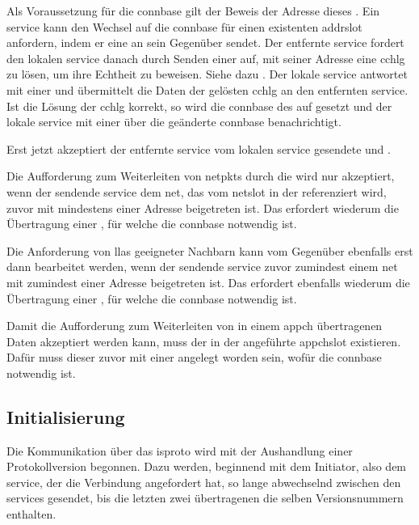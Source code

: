 Als Voraussetzung für die \gls{connbase}  gilt der Beweis der Adresse dieses
. Ein \gls{service} kann den Wechsel auf die \gls{connbase}
 für einen existenten \gls{addrslot} anfordern, indem er eine \msg{\isprotots}
an sein Gegenüber sendet.
Der entfernte \gls{service} fordert den lokalen \gls{service} danach durch Senden einer
\msg{\isprotoccreq} auf, mit seiner Adresse eine \gls{cchlg} zu lösen, um ihre Echtheit zu
beweisen. Siehe dazu .
Der lokale \gls{service} antwortet mit einer \msg{\isprotoccrep} und übermittelt die Daten der
gelösten \gls{cchlg} an den entfernten \gls{service}.
Ist die Lösung der \gls{cchlg} korrekt, so wird die \gls{connbase} des
 auf  gesetzt und der lokale \gls{service} mit
einer \msg{\isprotocbn} über die geänderte \gls{connbase} benachrichtigt.

Erst jetzt akzeptiert der entfernte \gls{service} vom lokalen \gls{service} gesendete
\msgpl{\isprotonjn} und \msgpl{\isprotonln}.

Die Aufforderung zum Weiterleiten von \glspl{netpkt} durch die \msg{\isprotonp} wird nur
akzeptiert, wenn der sendende \gls{service} dem \gls{net}, das vom \gls{netslot} in der
\msg{\isprotonp} referenziert wird, zuvor mit mindestens einer Adresse beigetreten ist.
Das erfordert wiederum die Übertragung einer \msg{\isprotonjn}, für welche die \gls{connbase}
 notwendig ist.

Die Anforderung von \glspl{lla} geeigneter Nachbarn kann vom Gegenüber ebenfalls erst dann
bearbeitet werden, wenn der sendende \gls{service} zuvor zumindest einem \gls{net} mit zumindest
einer Adresse beigetreten ist.
Das erfordert ebenfalls wiederum die Übertragung einer \msg{\isprotonjn}, für welche die
\gls{connbase}  notwendig ist.

Damit die Aufforderung zum Weiterleiten von in einem \gls{appch} übertragenen Daten akzeptiert
werden kann, muss der in der \msg{\isprotoacd} angeführte \gls{appchslot} existieren. Dafür
muss dieser zuvor mit einer \msg{\isprotoacsa} angelegt worden sein, wofür die \gls{connbase}
 notwendig ist.

\subsection{Initialisierung}
Die Kommunikation über das \gls{isproto} wird mit der Aushandlung einer Protokollversion begonnen.
Dazu werden, beginnend mit dem Initiator, also dem \gls{service}, der die Verbindung angefordert hat,
so lange \msgpl{\isprotoversion} abwechselnd zwischen den \glspl{service} gesendet, bis die letzten
zwei übertragenen \msgpl{\isprotoversion} die selben Versionsnummern enthalten.

